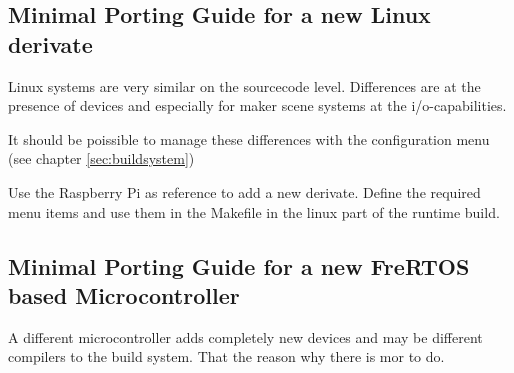 \subsection{Minimal Porting Guide for a new Linux derivate}
Linux systems are very similar on the sourcecode level. Differences are
at the presence of devices and especially for maker scene systems at 
the i/o-capabilities.

It should be poissible to manage these differences with the 
configuration menu (see chapter \ref{sec:buildsystem})

Use the Raspberry Pi as reference to  add a new derivate. 
Define the required menu items and use them in the Makefile in the 
linux part of the runtime build.

\subsection{Minimal Porting Guide for a new FreRTOS based Microcontroller}
A different microcontroller adds completely new devices and may be different
compilers to the build system. That the reason why there is mor to do.

